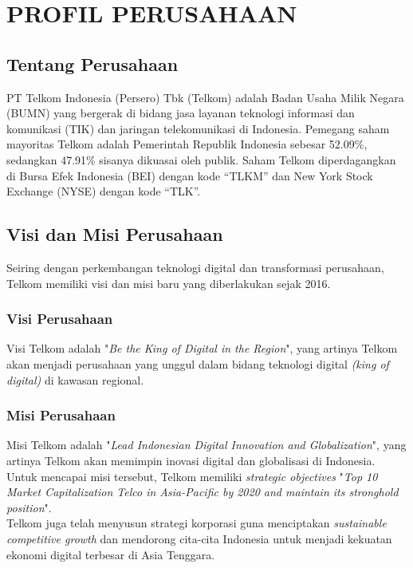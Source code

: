 \chapter{PROFIL PERUSAHAAN}
\section{Tentang Perusahaan}
\tab PT Telkom Indonesia (Persero) Tbk (Telkom) adalah Badan Usaha Milik Negara (BUMN) yang bergerak di bidang jasa layanan teknologi informasi dan komunikasi (TIK) dan jaringan telekomunikasi di Indonesia. Pemegang saham mayoritas Telkom adalah Pemerintah Republik Indonesia sebesar 52.09\%, sedangkan 47.91\% sisanya dikuasai oleh publik. Saham Telkom diperdagangkan di Bursa Efek Indonesia (BEI) dengan kode “TLKM” dan New York Stock Exchange (NYSE) dengan kode “TLK”.\cite{Profil Telkom}

\section{Visi dan Misi Perusahaan}
\tab Seiring dengan perkembangan teknologi digital dan transformasi perusahaan, Telkom memiliki visi dan misi baru yang diberlakukan sejak 2016.
\subsection{Visi Perusahaan}
\tab Visi Telkom adalah "\textit{Be the King of Digital in the Region}", yang artinya Telkom akan menjadi perusahaan yang unggul dalam bidang teknologi digital \textit{(king of digital)} di kawasan regional.
\subsection{Misi Perusahaan}
\tab Misi Telkom adalah "\textit{Lead Indonesian Digital Innovation and Globalization}", yang artinya Telkom akan memimpin inovasi digital dan globalisasi di Indonesia. Untuk mencapai misi tersebut, Telkom memiliki \textit{strategic objectives} "\textit{Top 10 Market Capitalization Telco in Asia-Pacific by 2020 and maintain its stronghold position}".\\
\tab Telkom juga telah menyusun strategi korporasi guna menciptakan \textit{sustainable competitive growth} dan mendorong cita-cita Indonesia untuk menjadi kekuatan ekonomi digital terbesar di Asia Tenggara.
	
